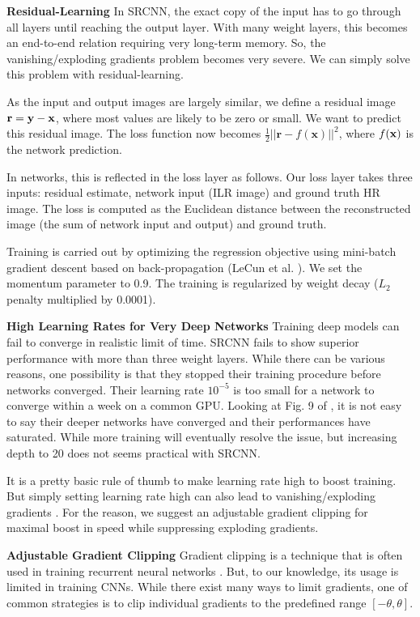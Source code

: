 \documentclass[10pt,twocolumn,letterpaper]{article}
\begin{document}
\textbf{Residual-Learning}  In SRCNN, the exact copy of the input has to go through all layers until reaching the output layer. With many weight layers, this becomes an end-to-end relation requiring very long-term memory. So, the vanishing/exploding gradients problem \cite{bengio1994learning} becomes very severe. We can simply solve this problem with residual-learning.

As the input and output images are largely similar, we define a residual image ${\bf r}={\bf y}-{\bf x}$, where most values are likely to be zero or small. We want to predict this residual image. The loss function now becomes $\frac{1}{2}||\mathbf{r}-f(\mathbf{x})||^{2}$, where $f(\bf{x})$ is the network prediction. 

In networks, this is reflected in the loss layer as follows. 
Our loss layer takes three inputs: residual estimate, network input (ILR image) and ground truth HR image. The loss is computed as the Euclidean distance between the reconstructed image (the sum of network input and output) and ground truth. 

Training is carried out by optimizing the regression objective using mini-batch gradient descent based on back-propagation (LeCun et al. \cite{lecun1998gradient}). We set the momentum parameter to 0.9. The training is regularized by weight decay ($L_2$ penalty multiplied by
0.0001).  

\textbf{High Learning Rates for Very Deep Networks}
Training deep models can fail to converge in realistic limit of time. SRCNN \cite{dong2015image} fails to show superior performance with more than three weight layers. While there can be various reasons, one possibility is that they stopped their training procedure before networks converged. Their learning rate $10^{-5}$ is too small for a network to converge within a week on a common GPU. Looking at Fig. 9 of \cite{dong2015image}, it is not easy to say their deeper networks have converged and their performances have saturated. While more training will eventually resolve the issue, but increasing depth to 20 does not seems practical with SRCNN.

It is a pretty basic rule of thumb to make learning rate high to boost training. But simply setting learning rate high can also lead to vanishing/exploding gradients \cite{bengio1994learning}. For the reason, we suggest an adjustable gradient clipping for maximal boost in speed while suppressing exploding gradients.

\textbf{Adjustable Gradient Clipping}
Gradient clipping is a technique that is often used in training recurrent neural networks \cite{pascanu2013difficulty}. But, to our knowledge, its usage is limited in training CNNs. While there exist many ways to limit gradients, one of common strategies is to clip individual gradients to the predefined range 
$[-\theta, \theta]$. 
\end{document}
